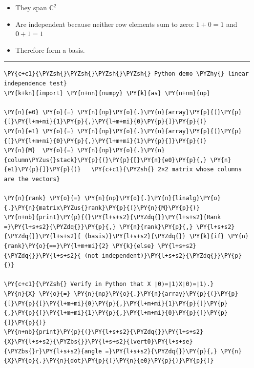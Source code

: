 \begin{itemize}
\item
  They span \(\mathbb C^{2}\)
\item
  Are independent because neither row elements sum to zero:
  \(1 + 0 = 1\) and \(0 + 1 = 1\)
\item
  Therefore form a basis.
\end{itemize}

\begin{center}\rule{0.5\linewidth}{0.5pt}\end{center}

    \begin{tcolorbox}[breakable, size=fbox, boxrule=1pt, pad at break*=1mm,colback=cellbackground, colframe=cellborder]
\begin{Verbatim}[commandchars=\\\{\}]
\PY{c+c1}{\PYZsh{}\PYZsh{}\PYZsh{}\PYZsh{} Python demo \PYZhy{} linear independence test}
\PY{k+kn}{import} \PY{n+nn}{numpy} \PY{k}{as} \PY{n+nn}{np}

\PY{n}{e0} \PY{o}{=} \PY{n}{np}\PY{o}{.}\PY{n}{array}\PY{p}{(}\PY{p}{[}\PY{l+m+mi}{1}\PY{p}{,}\PY{l+m+mi}{0}\PY{p}{]}\PY{p}{)}
\PY{n}{e1} \PY{o}{=} \PY{n}{np}\PY{o}{.}\PY{n}{array}\PY{p}{(}\PY{p}{[}\PY{l+m+mi}{0}\PY{p}{,}\PY{l+m+mi}{1}\PY{p}{]}\PY{p}{)}
\PY{n}{M}  \PY{o}{=} \PY{n}{np}\PY{o}{.}\PY{n}{column\PYZus{}stack}\PY{p}{(}\PY{p}{[}\PY{n}{e0}\PY{p}{,} \PY{n}{e1}\PY{p}{]}\PY{p}{)}   \PY{c+c1}{\PYZsh{} 2×2 matrix whose columns are the vectors}

\PY{n}{rank} \PY{o}{=} \PY{n}{np}\PY{o}{.}\PY{n}{linalg}\PY{o}{.}\PY{n}{matrix\PYZus{}rank}\PY{p}{(}\PY{n}{M}\PY{p}{)}
\PY{n+nb}{print}\PY{p}{(}\PY{l+s+s2}{\PYZdq{}}\PY{l+s+s2}{Rank =}\PY{l+s+s2}{\PYZdq{}}\PY{p}{,} \PY{n}{rank}\PY{p}{,} \PY{l+s+s2}{\PYZdq{}}\PY{l+s+s2}{ (basis)}\PY{l+s+s2}{\PYZdq{}} \PY{k}{if} \PY{n}{rank}\PY{o}{==}\PY{l+m+mi}{2} \PY{k}{else} \PY{l+s+s2}{\PYZdq{}}\PY{l+s+s2}{ (not independent)}\PY{l+s+s2}{\PYZdq{}}\PY{p}{)}

\PY{c+c1}{\PYZsh{} Verify in Python that X ∣0⟩=∣1⟩X∣0⟩=∣1⟩.}
\PY{n}{X} \PY{o}{=} \PY{n}{np}\PY{o}{.}\PY{n}{array}\PY{p}{(}\PY{p}{[}\PY{p}{[}\PY{l+m+mi}{0}\PY{p}{,}\PY{l+m+mi}{1}\PY{p}{]}\PY{p}{,}\PY{p}{[}\PY{l+m+mi}{1}\PY{p}{,}\PY{l+m+mi}{0}\PY{p}{]}\PY{p}{]}\PY{p}{)}
\PY{n+nb}{print}\PY{p}{(}\PY{l+s+s2}{\PYZdq{}}\PY{l+s+s2}{X}\PY{l+s+s2}{\PYZbs{}}\PY{l+s+s2}{lvert0}\PY{l+s+se}{\PYZbs{}r}\PY{l+s+s2}{angle =}\PY{l+s+s2}{\PYZdq{}}\PY{p}{,} \PY{n}{X}\PY{o}{.}\PY{n}{dot}\PY{p}{(}\PY{n}{e0}\PY{p}{)}\PY{p}{)}
\end{Verbatim}
\end{tcolorbox}

